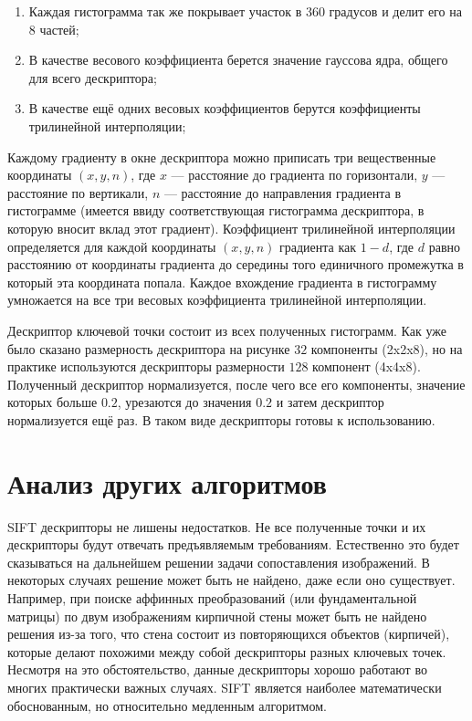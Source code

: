 \begin{enumerate}
    \item Каждая гистограмма так же покрывает участок в 360 градусов и делит его на 8 частей;
    \item В качестве весового коэффициента берется значение гауссова ядра, общего для всего дескриптора;
    \item В качестве ещё одних весовых коэффициентов берутся коэффициенты трилинейной интерполяции;
\end{enumerate}

Каждому градиенту в окне дескриптора можно приписать три вещественные координаты $(x, y, n)$, где $x$ — расстояние до градиента по горизонтали, $y$ — расстояние по вертикали, $n$ — расстояние до направления градиента в гистограмме (имеется ввиду соответствующая гистограмма дескриптора, в которую вносит вклад этот градиент). Коэффициент трилинейной интерполяции определяется для каждой координаты $(x, y, n)$ градиента как $1-d$, где $d$ равно расстоянию от координаты градиента до середины того единичного промежутка в который эта координата попала. Каждое вхождение градиента в гистограмму умножается на все три весовых коэффициента трилинейной интерполяции.

Дескриптор ключевой точки состоит из всех полученных гистограмм. Как уже было сказано размерность дескриптора на рисунке $32$ компоненты (2x2x8), но на практике используются дескрипторы размерности $128$ компонент (4x4x8). Полученный дескриптор нормализуется, после чего все его компоненты, значение которых больше $0.2$, урезаются до значения $0.2$ и затем дескриптор нормализуется ещё раз. В таком виде дескрипторы готовы к использованию.

\section{Анализ других алгоритмов}

SIFT дескрипторы не лишены недостатков. Не все полученные точки и их дескрипторы будут отвечать предъявляемым требованиям. Естественно это будет сказываться на дальнейшем решении задачи сопоставления изображений. В некоторых случаях решение может быть не найдено, даже если оно существует. Например, при поиске аффинных преобразований (или фундаментальной матрицы) по двум изображениям кирпичной стены может быть не найдено решения из-за того, что стена состоит из повторяющихся объектов (кирпичей), которые делают похожими между собой дескрипторы разных ключевых точек. Несмотря на это обстоятельство, данные дескрипторы хорошо работают во многих практически важных случаях. SIFT является наиболее математически обоснованным, но относительно медленным алгоритмом.

